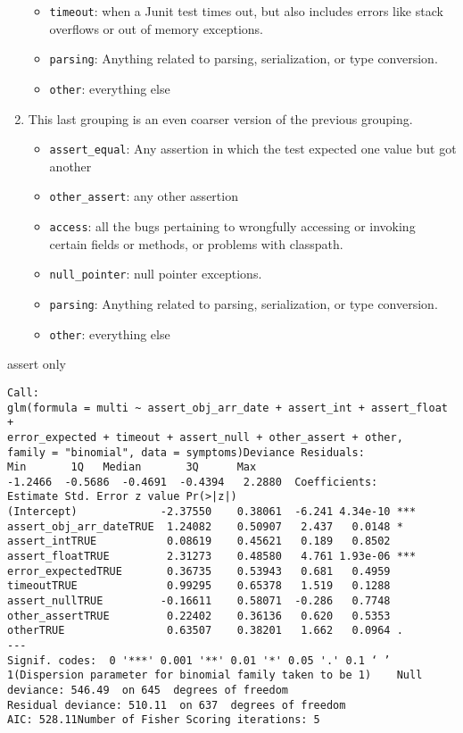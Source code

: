 \begin{enumerate}
\begin{itemize}
		\item \lstinline{timeout}: when a Junit test times out, but also includes errors like stack overflows or out of memory exceptions.
		\item \lstinline{parsing}: Anything related to parsing, serialization, or type conversion.
		\item \lstinline{other}: everything else
	\end{itemize}
	\item This last grouping is an even coarser version of the previous grouping.
	\begin{itemize}
		\item \lstinline{assert_equal}: Any assertion in which the test expected one value but got another
		\item \lstinline{other_assert}: any other assertion
		\item \lstinline{access}: all the bugs pertaining to wrongfully accessing or invoking certain fields or methods, or problems with classpath.
		\item \lstinline{null_pointer}: null pointer exceptions.
		\item \lstinline{parsing}: Anything related to parsing, serialization, or type conversion.
		\item \lstinline{other}: everything else
	\end{itemize}
\end{enumerate}


assert only
\begin{lstlisting}
Call:
glm(formula = multi ~ assert_obj_arr_date + assert_int + assert_float + 
error_expected + timeout + assert_null + other_assert + other, 
family = "binomial", data = symptoms)Deviance Residuals: 
Min       1Q   Median       3Q      Max  
-1.2466  -0.5686  -0.4691  -0.4394   2.2880  Coefficients:
Estimate Std. Error z value Pr(>|z|)    
(Intercept)             -2.37550    0.38061  -6.241 4.34e-10 ***
assert_obj_arr_dateTRUE  1.24082    0.50907   2.437   0.0148 *  
assert_intTRUE           0.08619    0.45621   0.189   0.8502    
assert_floatTRUE         2.31273    0.48580   4.761 1.93e-06 ***
error_expectedTRUE       0.36735    0.53943   0.681   0.4959    
timeoutTRUE              0.99295    0.65378   1.519   0.1288    
assert_nullTRUE         -0.16611    0.58071  -0.286   0.7748    
other_assertTRUE         0.22402    0.36136   0.620   0.5353    
otherTRUE                0.63507    0.38201   1.662   0.0964 .  
---
Signif. codes:  0 '***' 0.001 '**' 0.01 '*' 0.05 '.' 0.1 ‘ ’ 1(Dispersion parameter for binomial family taken to be 1)    Null deviance: 546.49  on 645  degrees of freedom
Residual deviance: 510.11  on 637  degrees of freedom
AIC: 528.11Number of Fisher Scoring iterations: 5
\end{lstlisting}

